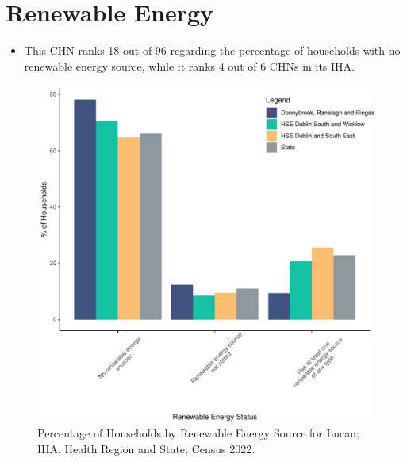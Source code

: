 \documentclass{article}
\begin{document}
\section{Renewable Energy}\label{sect:RE}
\begin{itemize}
\item This CHN ranks  18 out of 96 regarding the percentage of households with no renewable energy source, while it ranks   4 out of 6 CHNs in its IHA.
\end{itemize}
\begin{figure}[H]
	\centering
	\includegraphics[width = 140mm]{../figures/RenewableEnergyED.pdf}
	\caption{Percentage of Households by Renewable Energy Source for Lucan; IHA, Health Region and State; Census 2022.}
	\label{fig:vbnv}
	\end{figure}
\end{document}
